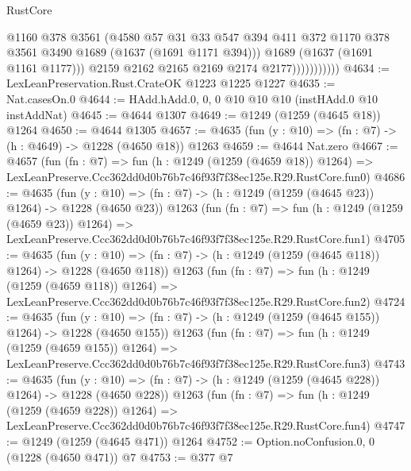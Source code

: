 \begin{lexlean}{RustCore}
\begin{coremodule}
                            @1160
                            @378
                            @3561
                            (@4580
                              @57
                              @31
                              @33
                              @547
                              @394
                              @411
                              @372
                              @1170
                              @378
                              @3561
                              @3490
                              @1689
                              (@1637 (@1691 @1171 @394)))
                            @1689
                            (@1637 (@1691 @1161 @1177)))
                          @2159
                          @2162
                          @2165
                          @2169
                          @2174
                          @2177)))))))))))
@4634 := LexLeanPreservation.Rust.CrateOK @1223 @1225 @1227
@4635 := Nat.casesOn.{0}
@4644 := HAdd.hAdd.{0, 0, 0} @10 @10 @10 (instHAdd.{0} @10 instAddNat)
@4645 := @4644 @1307
@4649 := @1249 (@1259 (@4645 @18)) @1264
@4650 := @4644 @1305
@4657 := @4635 (fun (y : @10) => (fn : @7) -> (h : @4649) -> @1228 (@4650 @18)) @1263
@4659 := @4644 Nat.zero
@4667 := @4657
    (fun (fn : @7) =>
    fun (h : @1249 (@1259 (@4659 @18)) @1264) =>
    LexLeanPreserve.Ccc362dd0d0b76b7c46f93f7f38ec125e.R29.RustCore.fun0)
@4686 := @4635
    (fun (y : @10) => (fn : @7) -> (h : @1249 (@1259 (@4645 @23)) @1264) -> @1228 (@4650 @23))
    @1263
    (fun (fn : @7) =>
    fun (h : @1249 (@1259 (@4659 @23)) @1264) =>
    LexLeanPreserve.Ccc362dd0d0b76b7c46f93f7f38ec125e.R29.RustCore.fun1)
@4705 := @4635
    (fun (y : @10) => (fn : @7) -> (h : @1249 (@1259 (@4645 @118)) @1264) -> @1228 (@4650 @118))
    @1263
    (fun (fn : @7) =>
    fun (h : @1249 (@1259 (@4659 @118)) @1264) =>
    LexLeanPreserve.Ccc362dd0d0b76b7c46f93f7f38ec125e.R29.RustCore.fun2)
@4724 := @4635
    (fun (y : @10) => (fn : @7) -> (h : @1249 (@1259 (@4645 @155)) @1264) -> @1228 (@4650 @155))
    @1263
    (fun (fn : @7) =>
    fun (h : @1249 (@1259 (@4659 @155)) @1264) =>
    LexLeanPreserve.Ccc362dd0d0b76b7c46f93f7f38ec125e.R29.RustCore.fun3)
@4743 := @4635
    (fun (y : @10) => (fn : @7) -> (h : @1249 (@1259 (@4645 @228)) @1264) -> @1228 (@4650 @228))
    @1263
    (fun (fn : @7) =>
    fun (h : @1249 (@1259 (@4659 @228)) @1264) =>
    LexLeanPreserve.Ccc362dd0d0b76b7c46f93f7f38ec125e.R29.RustCore.fun4)
@4747 := @1249 (@1259 (@4645 @471)) @1264
@4752 := Option.noConfusion.{0, 0} (@1228 (@4650 @471)) @7
@4753 := @377 @7

\end{coremodule}
\end{lexlean}
